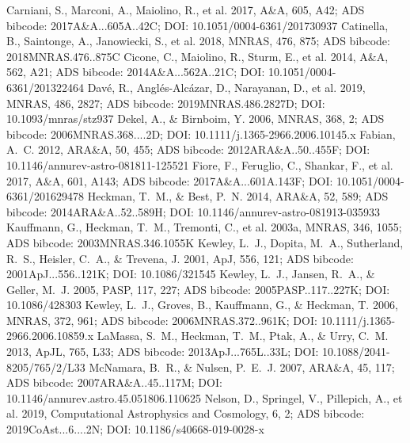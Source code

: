 \documentclass[twocolumn]{aastex631}
\begin{document}
\begin{thebibliography}{}
 Carniani, S., Marconi, A., Maiolino, R., et al. 2017, A\&A, 605, A42; ADS bibcode: 2017A\&A...605A..42C; DOI: 10.1051/0004-6361/201730937
 Catinella, B., Saintonge, A., Janowiecki, S., et al. 2018, MNRAS, 476, 875; ADS bibcode: 2018MNRAS.476..875C
 Cicone, C., Maiolino, R., Sturm, E., et al. 2014, A\&A, 562, A21; ADS bibcode: 2014A\&A...562A..21C; DOI: 10.1051/0004-6361/201322464
 Dav{\'e}, R., Angl{\'e}s-Alc{\'a}zar, D., Narayanan, D., et al. 2019, MNRAS, 486, 2827; ADS bibcode: 2019MNRAS.486.2827D; DOI: 10.1093/mnras/stz937
 Dekel, A., \& Birnboim, Y. 2006, MNRAS, 368, 2; ADS bibcode: 2006MNRAS.368....2D; DOI: 10.1111/j.1365-2966.2006.10145.x
 Fabian, A.~C. 2012, ARA\&A, 50, 455; ADS bibcode: 2012ARA\&A..50..455F; DOI: 10.1146/annurev-astro-081811-125521
 Fiore, F., Feruglio, C., Shankar, F., et al. 2017, A\&A, 601, A143; ADS bibcode: 2017A\&A...601A.143F; DOI: 10.1051/0004-6361/201629478
 Heckman, T.~M., \& Best, P.~N. 2014, ARA\&A, 52, 589; ADS bibcode: 2014ARA\&A..52..589H; DOI: 10.1146/annurev-astro-081913-035933
 Kauffmann, G., Heckman, T.~M., Tremonti, C., et al. 2003a, MNRAS, 346, 1055; ADS bibcode: 2003MNRAS.346.1055K
 Kewley, L.~J., Dopita, M.~A., Sutherland, R.~S., Heisler, C.~A., \& Trevena, J. 2001, ApJ, 556, 121; ADS bibcode: 2001ApJ...556..121K; DOI: 10.1086/321545
 Kewley, L.~J., Jansen, R.~A., \& Geller, M.~J. 2005, PASP, 117, 227; ADS bibcode: 2005PASP..117..227K; DOI: 10.1086/428303
 Kewley, L.~J., Groves, B., Kauffmann, G., \& Heckman, T. 2006, MNRAS, 372, 961; ADS bibcode: 2006MNRAS.372..961K; DOI: 10.1111/j.1365-2966.2006.10859.x
 LaMassa, S.~M., Heckman, T.~M., Ptak, A., \& Urry, C.~M. 2013, ApJL, 765, L33; ADS bibcode: 2013ApJ...765L..33L; DOI: 10.1088/2041-8205/765/2/L33
 McNamara, B.~R., \& Nulsen, P.~E.~J. 2007, ARA\&A, 45, 117; ADS bibcode: 2007ARA\&A..45..117M; DOI: 10.1146/annurev.astro.45.051806.110625
 Nelson, D., Springel, V., Pillepich, A., et al. 2019, Computational Astrophysics and Cosmology, 6, 2; ADS bibcode: 2019CoAst...6....2N; DOI: 10.1186/s40668-019-0028-x

\end{thebibliography}
\end{document}
